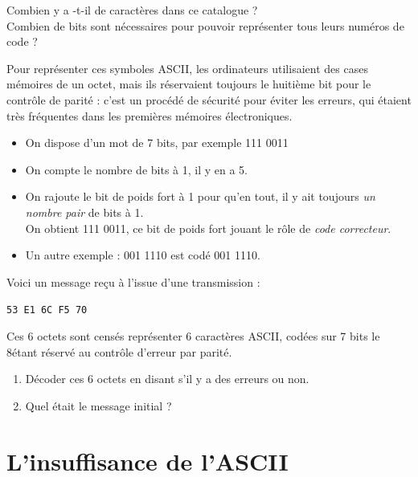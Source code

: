 \begin{exercice}
    Combien y a -t-il de caractères dans ce catalogue ?\\
    Combien de bits sont nécessaires pour pouvoir représenter tous leurs numéros de code ?
\end{exercice}


Pour représenter ces symboles ASCII, les ordinateurs utilisaient des cases mémoires de un octet, mais ils réservaient toujours le huitième bit pour le contrôle de parité : c'est un procédé de sécurité pour
éviter les erreurs, qui étaient très fréquentes dans les premières mémoires électroniques.\\
\begin{methode}
    \begin{itemize}
        \item 	On dispose d'un mot de 7 bits, par exemple 111 0011
        \item 	On compte le nombre de bits à 1, il y en a 5.
        \item 	On rajoute le bit de poids fort à 1 pour qu'en tout, il y ait toujours \textit{un nombre pair} de bits à 1.\\
              On obtient 111 0011, ce bit de poids fort jouant le rôle de \textit{code correcteur}.
        \item 	Un autre exemple : 001 1110 est codé 001 1110.
    \end{itemize}
\end{methode}

\begin{exercice}[]
    Voici un message reçu à l'issue d'une transmission :
    \begin{center}
        \texttt{53 E1 6C F5 70}
    \end{center}
    Ces 6 octets sont censés représenter 6 caractères ASCII, codées sur 7 bits le 8\eme étant réservé au contrôle d'erreur par parité.
    \begin{enumerate}
        \item 	Décoder ces 6 octets en disant s'il y a des erreurs ou non.
        \item 	Quel était le message initial ?
    \end{enumerate}
\end{exercice}


\section{L'insuffisance de l'ASCII}

